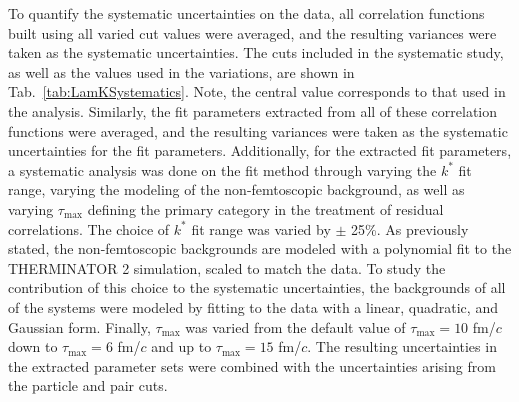 \documentclass[ALICE,manyauthors]{cernphprep}
\newcommand{\kstar}{$k^{*}$\xspace}
\begin{document}
To quantify the systematic uncertainties on the data, all correlation functions built using all varied cut values were averaged, and the resulting variances were taken as the systematic uncertainties.  
The cuts included in the systematic study, as well as the values used in the variations, are shown in Tab.\ \ref{tab:LamKSystematics}.  
Note, the central value corresponds to that used in the analysis.
Similarly, the fit parameters extracted from all of these correlation functions were averaged, and the resulting variances were taken as the systematic uncertainties for the fit parameters.
Additionally, for the extracted fit parameters, a systematic analysis was done on the fit method through varying the \kstar fit range, varying the modeling of the non-femtoscopic background, as well as varying $\tau_{\mathrm{max}}$ defining the primary category in the treatment of residual correlations.
The choice of \kstar fit range was varied by $\pm$ 25\%. 
As previously stated, the non-femtoscopic backgrounds are modeled with a polynomial fit to the THERMINATOR 2 simulation, scaled to match the data.
To study the contribution of this choice to the systematic uncertainties, the backgrounds of all of the systems were modeled by fitting to the data with a linear, quadratic, and Gaussian form.
Finally, $\tau_{\mathrm{max}}$ was varied from the default value of $\tau_{\mathrm{max}} = 10$ fm/$c$ down to $\tau_{\mathrm{max}} = 6$ fm/$c$ and up to $\tau_{\mathrm{max}} = 15$ fm/$c$.
The resulting uncertainties in the extracted parameter sets were combined with the uncertainties arising from the particle and pair cuts.
\end{document}
